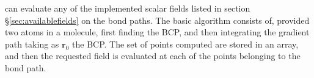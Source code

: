 \DTK{} can evaluate any of the implemented scalar fields listed in section \S\ref{sec:availablefields} on the bond paths. The basic algorithm consists of, provided two atoms in a molecule, first finding the BCP, and then integrating the gradient path taking as $\boldsymbol{r}_0$ the BCP. The set of points computed are stored in an array, and then the requested field is evaluated at each of the points belonging to the bond path.











